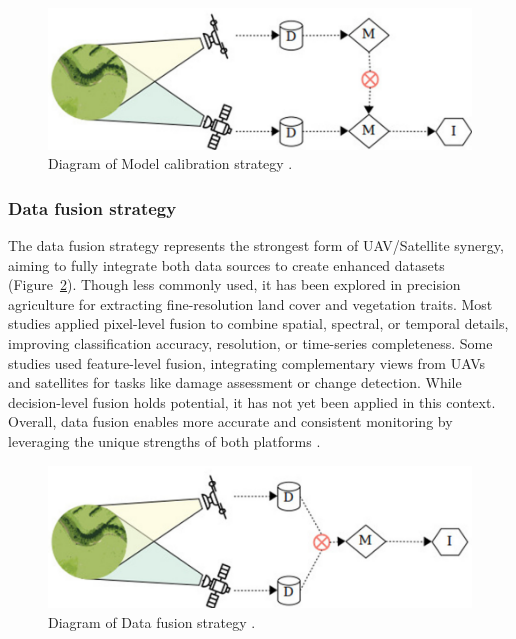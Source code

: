 \begin{figure}[H]
    \centering
    \includegraphics[width=0.8
    \textwidth]{chapters/chapter3/images/Figure14.png}
    \caption{Diagram of Model calibration strategy \parencite{AlvarezVanhard2021}.}
    \label{fig:ModelCalibration}
\end{figure}


\subsubsection{Data fusion strategy}

The data fusion strategy represents the strongest form of UAV/Satellite synergy, aiming to fully integrate both data sources to create enhanced datasets (Figure~\ref{fig:DataFusion}). Though less commonly used, it has been explored in precision agriculture for extracting fine-resolution land cover and vegetation traits. Most studies applied pixel-level fusion to combine spatial, spectral, or temporal details, improving classification accuracy, resolution, or time-series completeness. Some studies used feature-level fusion, integrating complementary views from UAVs and satellites for tasks like damage assessment or change detection. While decision-level fusion holds potential, it has not yet been applied in this context. Overall, data fusion enables more accurate and consistent monitoring by leveraging the unique strengths of both platforms \parencite{AlvarezVanhard2021}.

\begin{figure}[H]
    \centering
    \includegraphics[width=0.8
    \textwidth]{chapters/chapter3/images/Figure15.png}
    \caption{Diagram of Data fusion strategy \parencite{AlvarezVanhard2021}.}
    \label{fig:DataFusion}
\end{figure}

